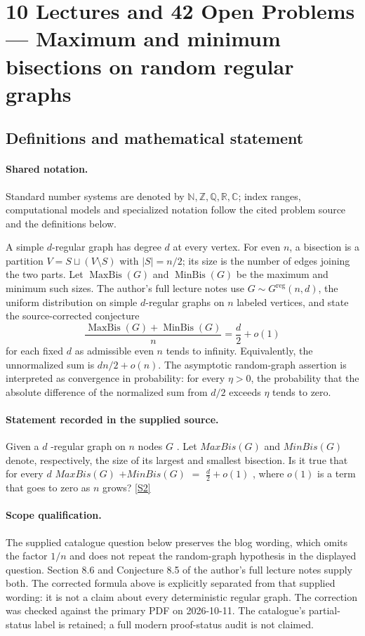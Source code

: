 \documentclass[11pt]{article}
\newcommand{\sref}[2]{\hyperlink{source:#1:#2}{[S#2]}}
\begin{document}
\section{10 Lectures and 42 Open Problems — Maximum and minimum bisections on random regular graphs}\label{statement}

\subsection{Definitions and mathematical statement}

\paragraph{Shared notation.}Standard number systems are denoted by $\mathbb N,\mathbb Z,\mathbb Q,\mathbb R,\mathbb C$; index ranges, computational models and specialized notation follow the cited problem source and the definitions below.


A simple $d$-regular graph has degree $d$ at every vertex. For even $n$, a bisection is a partition $V=S\sqcup(V\setminus S)$ with $|S|=n/2$; its size is the number of edges joining the two parts. Let $\operatorname{MaxBis}(G)$ and $\operatorname{MinBis}(G)$ be the maximum and minimum such sizes. The author's full lecture notes use $G\sim G^{\mathrm{reg}}(n,d)$, the uniform distribution on simple $d$-regular graphs on $n$ labeled vertices, and state the source-corrected conjecture
\[
 \frac{\operatorname{MaxBis}(G)+\operatorname{MinBis}(G)}{n}
 =\frac d2+o(1)
\]
for each fixed $d$ as admissible even $n$ tends to infinity. Equivalently, the unnormalized sum is $dn/2+o(n)$. The asymptotic random-graph assertion is interpreted as convergence in probability: for every $\eta>0$, the probability that the absolute difference of the normalized sum from $d/2$ exceeds $\eta$ tends to zero.
\paragraph{Statement recorded in the supplied source.}
Given a $d$ -regular graph on $n$ nodes $G$ . Let $MaxBis(G)$ and $MinBis(G)$ denote, respectively, the size of its largest and smallest bisection. Is it true that for every $d$ $MaxBis(G)$ $+ MinBis(G)$ $=$ $\frac{d}{2} + o(1)$ , where $o(1)$ is a term that goes to zero as $n$ grows? \sref{statement}{2}
\paragraph{Scope qualification.}
The supplied catalogue question below preserves the blog wording, which omits the factor $1/n$ and does not repeat the random-graph hypothesis in the displayed question. Section 8.6 and Conjecture 8.5 of the author's full lecture notes supply both. The corrected formula above is explicitly separated from that supplied wording: it is not a claim about every deterministic regular graph. The correction was checked against the primary PDF on 2026-10-11. The catalogue's partial-status label is retained; a full modern proof-status audit is not claimed.
\end{document}
